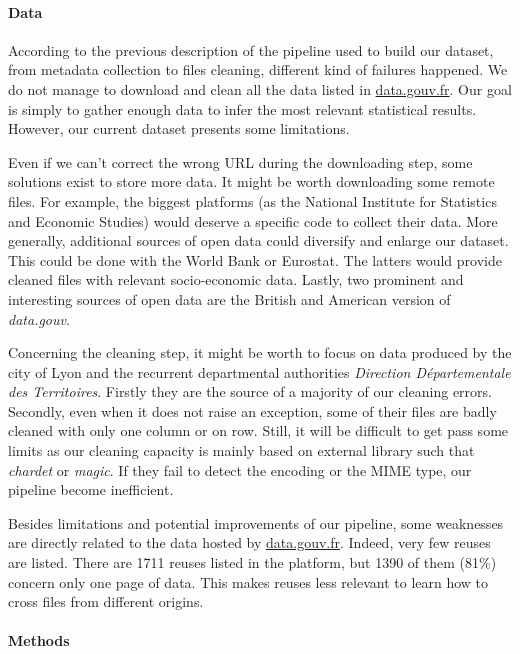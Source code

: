 \documentclass[a4paper]{article}
\begin{document}
	\paragraph{Data}
	
	According to the previous description of the pipeline used to build our dataset, from metadata collection to files cleaning, different kind of failures happened. We do not manage to download and clean all the data listed in \href{http://www.data.gouv.fr/fr/}{data.gouv.fr}. Our goal is simply to gather enough data to infer the most relevant statistical results. However, our current dataset presents some limitations. 
	
	Even if we can't correct the wrong URL during the downloading step, some solutions exist to store more data. It might be worth downloading some remote files. For example, the biggest platforms (as the National Institute for Statistics and Economic Studies) would deserve a specific code to collect their data. More generally, additional sources of open data could diversify and enlarge our dataset. This could be done with the World Bank or Eurostat. The latters would provide cleaned files with relevant socio-economic data. Lastly, two prominent and interesting sources of open data are the British and American version of \emph{data.gouv}.
	
	Concerning the cleaning step, it might be worth to focus on data produced by the city of Lyon and the recurrent departmental authorities \emph{Direction Départementale des Territoires}. Firstly they are the source of a majority of our cleaning errors. Secondly, even when it does not raise an exception, some of their files are badly cleaned with only one column or on row. Still, it will be difficult to get pass some limits as our cleaning capacity is mainly based on external library such that \emph{chardet} or \emph{magic}. If they fail to detect the encoding or the MIME type, our pipeline become inefficient.
	
	Besides limitations and potential improvements of our pipeline, some weaknesses are directly related to the data hosted by \href{http://www.data.gouv.fr/fr/}{data.gouv.fr}. Indeed, very few reuses are listed. There are 1711 reuses listed in the platform, but 1390 of them (81\%) concern only one page of data. This makes reuses less relevant to learn how to cross files from different origins.
	
	\paragraph{Methods}
	
\end{document}
